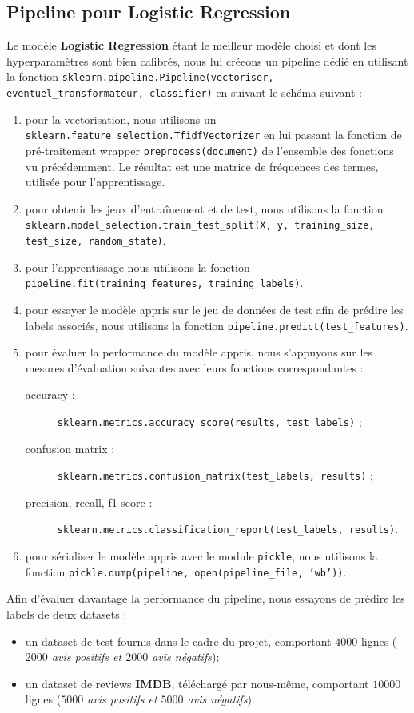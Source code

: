 \documentclass[12pt,a4paper]{report}
\theoremstyle{definition}
\begin{document}
\subsection{Pipeline pour Logistic Regression}
Le modèle \textbf{Logistic Regression} étant le meilleur modèle choisi et dont les hyperparamètres sont bien calibrés, nous lui créeons un pipeline dédié en utilisant la fonction \texttt{sklearn.pipeline.Pipeline(vectoriser, eventuel\_transformateur, classifier)} en suivant le schéma suivant :
\begin{enumerate}
  \item pour la vectorisation, nous utilisons un \texttt{sklearn.feature\_selection.TfidfVectorizer} en lui passant la fonction de pré-traitement wrapper \texttt{preprocess(document)} de l'ensemble des fonctions vu précédemment. Le résultat est une matrice de fréquences des termes, utilisée pour l'apprentissage.
  \item pour obtenir les jeux d'entraînement et de test, nous utilisons la fonction \texttt{sklearn.model\_selection.train\_test\_split(X, y, training\_size, test\_size, random\_state)}.
  \item pour l'apprentissage nous utilisons la fonction \texttt{pipeline.fit(training\_features, training\_labels)}.
  \item pour essayer le modèle appris sur le jeu de données de test afin de prédire les labels associés, nous utilisons la fonction \texttt{pipeline.predict(test\_features)}.
  \item pour évaluer la performance du modèle appris, nous s'appuyons sur les mesures d'évaluation suivantes avec leurs fonctions correspondantes :
  \begin{description}
    \item [accuracy :] \texttt{sklearn.metrics.accuracy\_score(results, test\_labels)} ;
    \item [confusion matrix :] \texttt{sklearn.metrics.confusion\_matrix(test\_labels, results)} ;
    \item [precision, recall, f1-score :] \texttt{sklearn.metrics.classification\_report(test\_labels, results)}.
  \end{description}
  \item pour sérialiser le modèle appris avec le module \texttt{pickle}, nous utilisons la fonction \texttt{pickle.dump(pipeline, open(pipeline\_file, 'wb'))}.
\end{enumerate}

Afin d'évaluer davantage la performance du pipeline, nous essayons de prédire les labels de deux datasets :
\begin{itemize}
  \item un dataset de test fournis dans le cadre du projet, comportant $4000$ lignes (\emph{$2000$ avis positifs et $2000$ avis négatifs});
  \item un dataset de reviews \textbf{IMDB}, téléchargé par nous-même, comportant $10000$ lignes (\emph{$5000$ avis positifs et $5000$ avis négatifs}).
\end{itemize}
\end{document}

